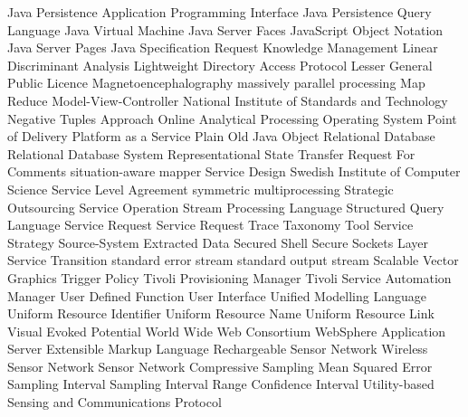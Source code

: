 \begin{acronym}[YTM]
  {Java Persistence Application Programming Interface}
 {Java Persistence Query Language}
  {Java Virtual Machine}
  {Java Server Faces}
 {JavaScript Object Notation}
  {Java Server Pages}
  {Java Specification Request}
   {Knowledge Management}
	{Linear Discriminant Analysis}
 {Lightweight Directory Access Protocol}
 {Lesser General Public Licence}
	{Magnetoencephalography}
	{massively parallel processing}
	{Map Reduce}
  {Model-View-Controller}
 {National Institute of Standards and Technology}
  {Negative Tuples Approach}
 {Online Analytical Processing} 
   {Operating System}
  {Point of Delivery}
 {Platform as a Service}
 {Plain Old Java Object}
  {Relational Database}
 {Relational Database System}
 {Representational State Transfer}
	{Request For Comments}
	{situation-aware mapper}
   {Service Design}
	{Swedish Institute of Computer Science}
  {Service Level Agreement}
	{symmetric multiprocessing}
	{Strategic Outsourcing}
  {Service Operation}
  {Stream Processing Language}
	{Structured Query Language}
   {Service Request}
 {Service Request Trace Taxonomy Tool}
   {Service Strategy}
 {Source-System Extracted Data}
  {Secured Shell}
  {Secure Sockets Layer}
   {Service Transition}
 {standard error stream}
 {standard output stream}
  {Scalable Vector Graphics}
   {Trigger Policy}
  {Tivoli Provisioning Manager}
 {Tivoli Service Automation Manager}
	{User Defined Function}
   {User Interface}
  {Unified Modelling Language}
  {Uniform Resource Identifier}
  {Uniform Resource Name}
  {Uniform Resource Link}
	{Visual Evoked Potential}
  {World Wide Web Consortium}
  {WebSphere Application Server}
  {Extensible Markup Language}
  {Rechargeable Sensor Network}
  {Wireless Sensor Network}
   {Sensor Network}
   {Compressive Sampling}
  {Mean Squared Error}
   {Sampling Interval}
  {Sampling Interval Range}
   {Confidence Interval}
 {Utility-based Sensing and Communications Protocol}
\end{acronym}